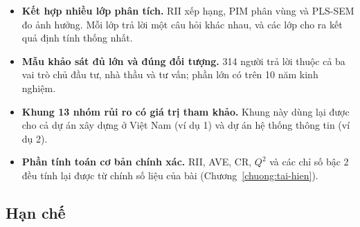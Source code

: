 \begin{itemize}
  \item \textbf{Kết hợp nhiều lớp phân tích.} RII xếp hạng, PIM phân vùng và PLS-SEM đo ảnh hưởng. Mỗi lớp trả lời một câu hỏi khác nhau, và các lớp cho ra kết quả định tính thống nhất.
  \item \textbf{Mẫu khảo sát đủ lớn và đúng đối tượng.} 314 người trả lời thuộc cả ba vai trò chủ đầu tư, nhà thầu và tư vấn; phần lớn có trên 10 năm kinh nghiệm.
  \item \textbf{Khung 13 nhóm rủi ro có giá trị tham khảo.} Khung này dùng lại được cho cả dự án xây dựng ở Việt Nam (ví dụ 1) và dự án hệ thống thông tin (ví dụ 2).
  \item \textbf{Phần tính toán cơ bản chính xác.} RII, AVE, CR, $Q^2$ và các chỉ số bậc 2 đều tính lại được từ chính số liệu của bài (Chương~\ref{chuong:tai-hien}).
\end{itemize}

\subsection{Hạn chế}

